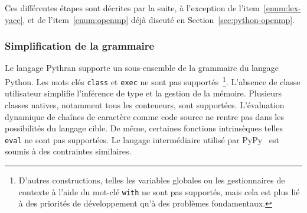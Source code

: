 \documentclass[renpar]{compas2013}
\begin{document}
Ces différentes étapes sont décrites par la suite, à l'exception de
l'item~\ref{enum:lex-yacc}, et de l'item~\ref{enum:openmp} déjà discuté en
Section~\ref{sec:python-openmp}.

\subsubsection{Simplification de la grammaire}

Le langage Pythran supporte un sous-ensemble de la grammaire du langage
Python. Les mots clés \texttt{class} et \texttt{exec} ne sont pas
supportés~\footnote{D'autres constructions, telles les variables globales
ou les gestionnaires de contexte à l'aide du mot-clé \texttt{with} ne sont
pas supportés, mais cela est plus lié à des priorités de développement
qu'à des problèmes fondamentaux.}. L'absence de classe utilisateur
simplifie l'inférence de type et la gestion de la mémoire. Plusieurs
classes natives, notamment tous les conteneurs, sont supportées.
L'évaluation dynamique de chaînes de caractère comme code source ne rentre
pas dans les possibilités du langage cible. De même, certaines fonctions
intrinsèques telles \texttt{eval} ne sont pas supportées. Le langage
intermédiaire utilisé par PyPy~\cite{rpython2007} est soumis à
des contraintes similaires.
\end{document}
